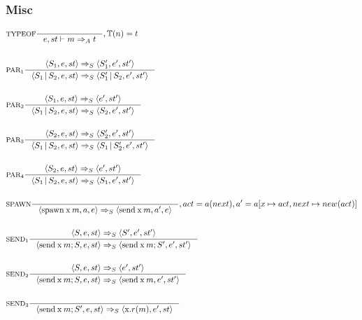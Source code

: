 \subsubsection{Misc}
\newcommand{\Tspawn}{\mathbin{\text{spawn}}}
\newcommand{\Tsend}{\mathbin{\text{send}}}
\begin{align*}
&\inference[TYPEOF]{}
                  {e,st \vdash m \Rightarrow_A t}
									{, \mathbb{T}(n) = t}
\\\\
&\inference[$\text{PAR}_1$]{\Braket{S_1,e,st} \Rightarrow_S \Braket{S_1',e',st'}}
                       {\Braket{S_1|S_2,e,st} \Rightarrow_S \Braket{S_1'|S_2,e',st'}}
\\\\
&\inference[$\text{PAR}_2$]{\Braket{S_1,e,st} \Rightarrow_S \Braket{e',st'}}
                       {\Braket{S_1|S_2,e,st} \Rightarrow_S \Braket{S_2,e',st'}}
\\\\
&\inference[$\text{PAR}_3$]{\Braket{S_2,e,st} \Rightarrow_S \Braket{S_2',e',st'}}
                       {\Braket{S_1|S_2,e,st} \Rightarrow_S \Braket{S_1|S_2',e',st'}}
\\\\
&\inference[$\text{PAR}_4$]{\Braket{S_2,e,st} \Rightarrow_S \Braket{e',st'}}
                       {\Braket{S_1|S_2,e,st} \Rightarrow_S \Braket{S_1,e',st'}}
\\\\
&\inference[$\text{SPAWN}$]{}
                       {\Braket{\Tspawn \Tx m,a,e} \Rightarrow_S \Braket{\Tsend \Tx m,a',e}}
												{, act = a(next), a' = a[x\mapsto act, next\mapsto new(act)]}
\\\\
&\inference[$\text{SEND}_1$]{\Braket{S,e,st} \Rightarrow_S \Braket{S',e',st'}}
                       {\Braket{\Tsend \Tx m ; S,e,st} \Rightarrow_S \Braket{\Tsend \Tx m;S',e',st'}}
\\\\
&\inference[$\text{SEND}_2$]{\Braket{S,e,st} \Rightarrow_S \Braket{e',st'}}
                       {\Braket{\Tsend \Tx m;S,e,st} \Rightarrow_S \Braket{\Tsend \Tx m,e',st'}}
\\\\
&\inference[$\text{SEND}_3$]{}
                       {\Braket{\Tsend \Tx m ; S',e,st} \Rightarrow_S \Braket{\Tx.r(m),e',st}}
\end{align*}